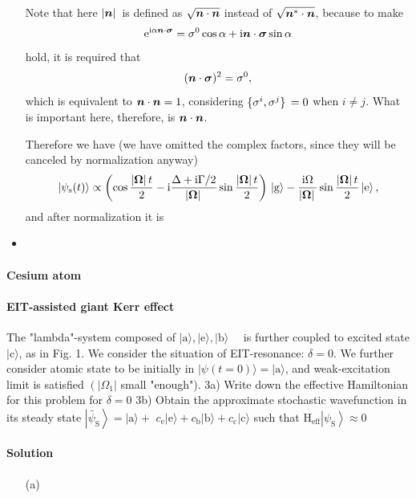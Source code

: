 \documentclass[hyperref, a4paper]{article}
\newcommand*{\ii}{\mathrm{i}}
\newcommand*{\ee}{\mathrm{e}}
\begin{document}
\begin{itemize}
\begin{equation}
\end{equation}
\begin{note*}{}{}
    Note that here $\abs*{\vb*{n}}$ is defined as $\sqrt{\vb*{n} \cdot \vb*{n}}$ instead of 
    $\sqrt{\vb*{n}^* \cdot \vb*{n}}$, because to make 
    \[
        \ee^{\ii \alpha \vb*{n} \cdot \vb*{\sigma}} = \sigma^0 \cos \alpha + \ii \vb*{n} \cdot \vb*{\sigma} \sin \alpha
    \]
    hold, it is required that 
    \[
        (\vb*{n} \cdot \vb*{\sigma})^2 = \sigma^0,
    \]
    which is equivalent to $\vb*{n} \cdot \vb*{n} = 1$, considering $\acomm*{\sigma^i}{\sigma^j} = 0$ 
    when $i \neq j$. What is important here, therefore, is $\vb*{n} \cdot \vb*{n}$.
\end{note*}
Therefore we have (we have omitted the complex factors, since they will be canceled by normalization anyway) 
\begin{equation}
    \ket*{\psi_\text{s}(t)} \propto \left( \cos \frac{\abs*{\vb*{\Omega}} t}{2} - \ii \frac{\Delta + \ii \Gamma / 2}{\abs*{\vb*{\Omega}}} \sin \frac{\abs*{\vb*{\Omega}} t}{2}  \right) \ket*{\text{g}} - \frac{\ii \Omega}{\abs*{\vb*{\Omega}}} \sin \frac{\abs*{\vb*{\Omega}} t}{2} \ket*{\text{e}},
\end{equation}
and after normalization it is 

\item

\end{itemize}

\paragraph{}

\paragraph{Cesium atom} 

\paragraph{EIT-assisted giant Kerr effect} The "lambda"-system composed of $|\text{a}\rangle,|\text{e}\rangle,|\text{b}\rangle \quad$ is further coupled to excited state $|\text{c}\rangle$, as in Fig. 1. We consider the situation of EIT-resonance: $\delta=0$. We further consider atomic state to be initially in $|\psi(t=0)\rangle=|\mathrm{a}\rangle$, and weak-excitation limit is satisfied $\left(\left|\Omega_{1}\right|\right.$ small "enough").
3a) Write down the effective Hamiltonian for this problem for $\delta=0$
3b) Obtain the approximate stochastic wavefunction in its steady state $\left|\widetilde{\psi_\text{S}}\right\rangle=|\text{a}\rangle+$ ${c}_{\mathrm{e}}|\text{e}\rangle+c_\text{b}|\text{b}\rangle+c_\text{c}|\text{c}\rangle$ such that $\mathrm{H}_{\mathrm{eff}}\left|\psi_{\mathrm{S}}\right\rangle \approx 0$

\paragraph{Solution} \begin{itemize}
\item[(a)]  
\end{itemize}

\paragraph{}
\end{document}
